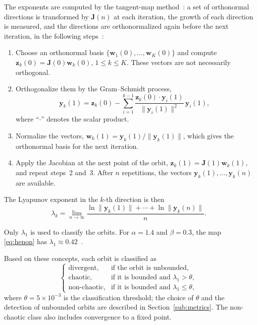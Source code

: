 \documentclass[journal]{IEEEtran}
\begin{document}
The exponents are computed by the tangent-map method~\cite{Alligood1996,Borges2022sbrt}:
a set of orthonormal directions is transformed by $\mathbf{J}(n)$ at each iteration,
the growth of each direction is measured, and the directions are orthonormalized
again before the next iteration, in the following steps~\cite{Alligood1996}:
\begin{enumerate}
  \item Choose an orthonormal basis $\{\mathbf{w}_1(0),\ldots,\mathbf{w}_K(0)\}$
  and compute $\mathbf{z}_k(0)=\mathbf{J}(0)\mathbf{w}_k(0)$, $1\le k\le K$.
  These vectors are not necessarily orthogonal.
  \item Orthogonalize them by the Gram--Schmidt process,
  \begin{equation}
    \mathbf{y}_k(1)=\mathbf{z}_k(0)-\sum_{i=1}^{k-1}
    \frac{\mathbf{z}_k(0)\cdot\mathbf{y}_i(1)}{\|\mathbf{y}_i(1)\|^2}\,
    \mathbf{y}_i(1),
    \label{eq:gs}
  \end{equation}
  where ``$\cdot$'' denotes the scalar product.
  \item Normalize the vectors, $\mathbf{w}_k(1)=\mathbf{y}_k(1)/\|\mathbf{y}_k(1)\|$,
  which gives the orthonormal basis for the next iteration.
  \item Apply the Jacobian at the next point of the orbit,
  $\mathbf{z}_k(1)=\mathbf{J}(1)\mathbf{w}_k(1)$, and repeat steps~2 and~3.
  After $n$ repetitions, the vectors $\mathbf{y}_k(1),\ldots,\mathbf{y}_k(n)$
  are available.
\end{enumerate}
The Lyapunov exponent in the $k$-th direction is then
\begin{equation}
  \lambda_k = \lim_{n\to\infty}
  \frac{\ln\|\mathbf{y}_k(1)\| + \cdots + \ln\|\mathbf{y}_k(n)\|}{n}.
  \label{eq:lyap}
\end{equation}

Only $\lambda_1$ is used to classify the orbits. For
$\alpha=1.4$ and $\beta=0.3$, the map
\eqref{eq:henon} has
$\lambda_1\approx0.42$~\cite{Sprott2003}.

Based on these concepts, each orbit is classified as
\begin{equation}
  \begin{cases}
    \text{divergent}, & \text{if the orbit is unbounded},\\
    \text{chaotic},   & \text{if it is bounded and } \lambda_1 > \theta, \\
    \text{non-chaotic}, & \text{if it is bounded and } \lambda_1 \le \theta,
  \end{cases}
  \label{eq:criterio}
\end{equation}
where $\theta=5\times10^{-3}$ is the classification threshold; the choice of $\theta$
and the detection of unbounded orbits are described in Section~\ref{sub:metrics}. The
non-chaotic class also includes convergence to a fixed point.
\end{document}
